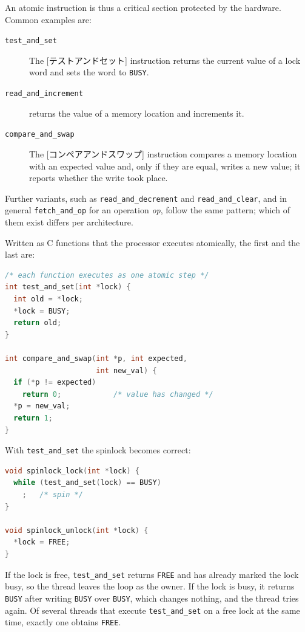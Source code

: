 \documentclass[../main.tex]{subfiles}
\begin{document}
An atomic instruction is thus a critical section protected by the hardware.
Common examples are:
\begin{description}
  \item[\texttt{test\_and\_set}] The [テストアンドセット]
    instruction returns the current value of a lock word and sets the word
    to \texttt{BUSY}.
  \item[\texttt{read\_and\_increment}] returns the value of a memory
    location and increments it.
  \item[\texttt{compare\_and\_swap}] The
    [コンペアアンドスワップ] instruction compares a
    memory location with an expected value and, only if they are equal,
    writes a new value; it reports whether the write took place.%
\end{description}
Further variants, such as \texttt{read\_and\_decrement} and
\texttt{read\_and\_clear}, and in general \texttt{fetch\_and\_op} for an
operation \emph{op}, follow the same pattern; which of them exist differs
per architecture.

Written as C functions that the processor executes atomically, the first
and the last are:
\begin{lstlisting}[language=C, numbers=none]
/* each function executes as one atomic step */
int test_and_set(int *lock) {
  int old = *lock;
  *lock = BUSY;
  return old;
}

int compare_and_swap(int *p, int expected,
                     int new_val) {
  if (*p != expected)
    return 0;            /* value has changed */
  *p = new_val;
  return 1;
}
\end{lstlisting}

With \texttt{test\_and\_set} the spinlock becomes correct:
\begin{lstlisting}[language=C, numbers=none]
void spinlock_lock(int *lock) {
  while (test_and_set(lock) == BUSY)
    ;   /* spin */
}

void spinlock_unlock(int *lock) {
  *lock = FREE;
}
\end{lstlisting}
If the lock is free, \texttt{test\_and\_set} returns \texttt{FREE} and has
already marked the lock busy, so the thread leaves the loop as the owner.
If the lock is busy, it returns \texttt{BUSY} after writing \texttt{BUSY}
over \texttt{BUSY}, which changes nothing, and the thread tries again.  Of
several threads that execute \texttt{test\_and\_set} on a free lock at the
same time, exactly one obtains \texttt{FREE}.
\end{document}
